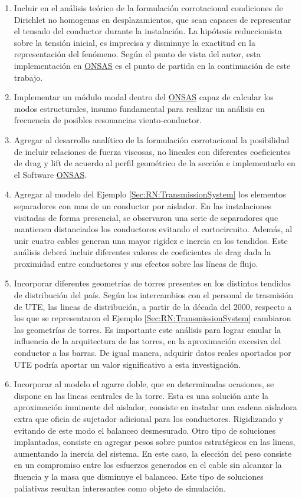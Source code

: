 \begin{enumerate}
	\item Incluir en el análisis teórico de la formulación corrotacional condiciones de Dirichlet no homogenas en desplazamientos, que sean capaces de  representar el tensado del conductor durante la instalación. La hipótesis reduccionista sobre la tensión inicial, es imprecisa y disminuye la exactitud en la representación del fenómeno. Según el punto de vista del autor, esta implementación en \href{https://github.com/ONSAS/ONSAS/}{ONSAS} es el punto de partida en la continuación de este trabajo. 
	\item Implementar un módulo modal dentro del \href{https://github.com/ONSAS/ONSAS/}{ONSAS} capaz de calcular los modos estructurales, insumo fundamental para realizar un análisis en frecuencia de posibles resonancias viento-conductor.
	\item Agregar al desarrollo analítico de la formulación corrotacional la posibilidad de incluir relaciones de fuerza viscosas, no lineales con diferentes coeficientes de drag y lift de acuerdo al perfil geométrico de la sección e implementarlo en el Software  \href{https://github.com/ONSAS/ONSAS/}{ONSAS}.
	\item Agregar al modelo del Ejemplo \ref{Sec:RN:TransmissionSystem} los elementos separadores con mas de un conductor por aislador. En las instalaciones visitadas de forma presencial, se observaron una serie de separadores que mantienen distanciados los conductores evitando el cortocircuito. Además, al unir cuatro cables generan una mayor rigidez e inercia en los tendidos. Este análisis deberá incluir diferentes valores de coeficientes de drag dada la proximidad entre conductores y sus efectos sobre las líneas de flujo.  
	\item Incorporar diferentes geometrías de torres presentes en los distintos tendidos de distribución del país. Según los intercambios con el personal de trasmisión de UTE, las lineas de distribución, a partir de la década del 2000, respecto a los que se representaron el Ejemplo \ref{Sec:RN:TransmissionSystem} cambiaron las geometrías de torres. Es importante este análisis para lograr emular la influencia de la arquitectura de las torres, en la aproximación excesiva del conductor a las barras. De igual manera, adquirir datos reales aportados por UTE podría aportar un valor significativo a esta investigación.
	\item Incorporar al modelo el agarre doble, que en determinadas ocasiones, se dispone en las lineas centrales de la torre. Esta es una solución ante la aproximación inminente del aislador, consiste en instalar una cadena aisladora extra que oficia de sujetador adicional para los conductores. Rigidizando y evitando de este modo el balanceo desmesurado. Otro tipo de soluciones implantadas, consiste en agregar pesos sobre puntos estratégicos en las lineas, aumentando la inercia del sistema. En este caso, la elección del peso consiste en un compromiso entre los esfuerzos generados en el cable sin alcanzar la fluencia y la masa que disminuye el balanceo. Este tipo de soluciones paliativas resultan interesantes como objeto de simulación.	

\end{enumerate}
